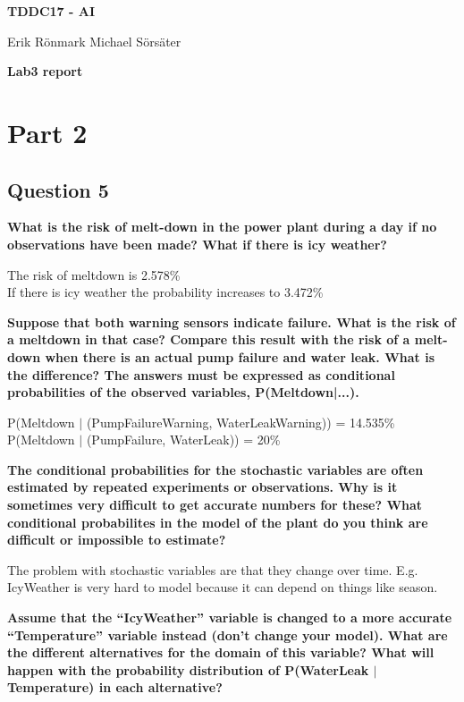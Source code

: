 \documentclass[12pt,a4paper]{article}
\begin{document}
\begin{center}
    \Huge
    \textbf{TDDC17 - AI}

    \vspace{0.3cm}
    \Large
    Erik Rönmark
    Michael Sörsäter
    
    \vspace{0.7cm}
    \textbf{Lab3 report}
\end{center}

\section{Part 2}
\subsection{Question 5}
\textbf{What is the risk of melt-down in the power plant during a day if no observations have been made? What if there is icy weather?}

The risk of meltdown is 2.578\% \\
If there is icy weather the probability increases to 3.472\%

\textbf{Suppose that both warning sensors indicate failure. What is the risk of a meltdown in that case? Compare this result with the risk of a melt-down when there is an actual pump failure and water leak. What is the difference? The answers must be expressed as conditional probabilities of the observed variables, P(Meltdown|...).}

P(Meltdown $|$ (PumpFailureWarning, WaterLeakWarning)) = 14.535\% \\
P(Meltdown $|$ (PumpFailure, WaterLeak)) = 20\%

\textbf{The conditional probabilities for the stochastic variables are often estimated by repeated experiments or observations. Why is it sometimes very difficult to get accurate numbers for these? What conditional probabilites in the model of the plant do you think are difficult or impossible to estimate?}

The problem with stochastic variables are that they change over time. E.g. IcyWeather is very hard to model because it can depend on things like season. 

\textbf{Assume that the ``IcyWeather'' variable is changed to a more accurate ``Temperature'' variable instead (don't change your model). What are the different alternatives for the domain of this variable? What will happen with the probability distribution of P(WaterLeak $|$ Temperature) in each alternative?}
\end{document}
